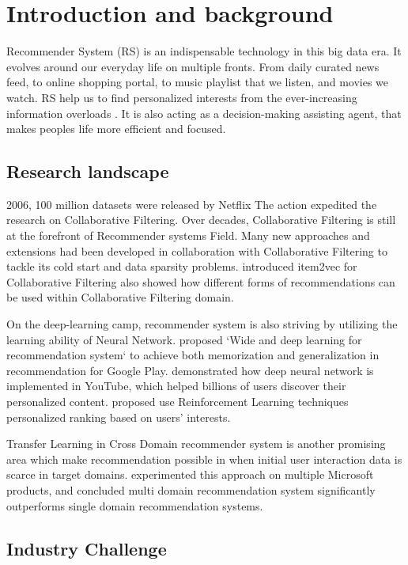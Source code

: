 \section{Introduction and background}
Recommender System (RS) is an indispensable technology in this big data era. It evolves around our everyday life on multiple fronts. From daily curated news feed, to online shopping portal, to music playlist that we listen, and movies we watch. RS help us to find personalized interests from the ever-increasing information overloads \citep{Lu2015}. It is also acting as a decision-making assisting agent, that makes peoples life more efficient and focused. 

\subsection{Research landscape}

2006, 100 million datasets were released by Netflix \citep{Bennett2007} The action expedited the research on Collaborative Filtering. Over decades, Collaborative Filtering is still at the forefront of Recommender systems Field. Many new approaches and extensions had been developed in collaboration with Collaborative Filtering to tackle its cold start and data sparsity problems. \citet{barkan2016item2vec} introduced item2vec for Collaborative Filtering also showed how different forms of recommendations can be used within Collaborative Filtering domain. 

On the deep-learning camp, recommender system is also striving by utilizing the learning ability of Neural Network. \citet{Cheng2016} proposed `Wide and deep learning for recommendation system` to achieve both memorization and generalization in recommendation for Google Play. \citet{Covington2016} demonstrated how deep neural network is implemented in YouTube, which helped billions of users discover their personalized content. \citet{Karatzoglou2013} proposed use Reinforcement Learning techniques personalized ranking based on users’ interests.  

Transfer Learning \citep{Pan2010} in Cross Domain recommender system is another promising area which make recommendation possible in when initial user interaction data is scarce in target domains. \citet{Elkahky2015} experimented this approach on multiple Microsoft products, and concluded multi domain recommendation system significantly outperforms single domain recommendation systems. 

\subsection{Industry Challenge}

